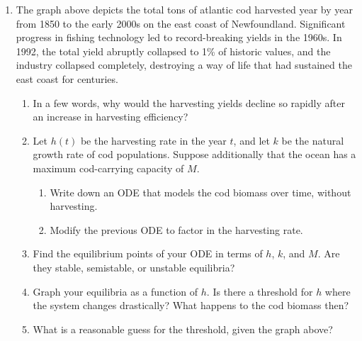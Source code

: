 \begin{enumerate}
\raggedright 

\item The graph above depicts the total tons of atlantic cod harvested  year by year from 1850 to the early 2000s on the east coast of Newfoundland. Significant progress in fishing technology led to record-breaking yields in the 1960s. In 1992, the total yield abruptly collapsed to 1\% of historic values, and the industry collapsed completely, destroying a way of life that had sustained the east coast for centuries.
\begin{enumerate}

\item In a few words, why would the harvesting yields decline so rapidly after an increase in harvesting efficiency?


\item Let $h(t)$ be the harvesting rate in the year $t$, and let $k$ be the natural growth rate of cod populations. Suppose additionally that the ocean has a maximum cod-carrying capacity of $M$.
\begin{enumerate}
    \item Write down an ODE that models the cod biomass over time, without harvesting.
    \item Modify the previous ODE to factor in the harvesting rate.
\end{enumerate}

\item  Find the equilibrium points of your ODE in terms of $h$, $k$, and $M$. Are they stable, semistable, or unstable equilibria?
\item Graph your equilibria as a function of $h$. Is there a threshold for $h$ where the system changes drastically? What happens to the cod biomass then?
\item What is a reasonable guess for the threshold, given the graph above?

\end{enumerate}


	
	    



\end{enumerate}